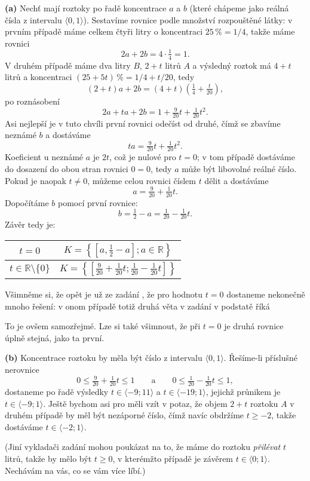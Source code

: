 \documentclass[12pt,a4paper]{article}
\newcommand{\R}{\mathbb{R}}
\theoremstyle{definition}
\newenvironment{res}{\proof}{\endproof}
\begin{document}
\begin{res}
\textbf{(a)}
Nechť mají roztoky po řadě koncentrace $a$ a $b$ (které chápeme jako reálná čísla z intervalu $\langle0, 1\rangle$). Sestavíme rovnice podle množství rozpouštěné látky: v prvním případě máme celkem čtyři litry o koncentraci $25\,\% = 1/4$, takže máme rovnici
\[ 2a + 2b = 4 \cdot \tfrac14 = 1. \]
V druhém případě máme dva litry $B$, $2+t$ litrů $A$ a výsledný roztok má $4 + t$ litrů a koncentraci $(25 + 5t)\,\% = 1/4 + t/20$, tedy
\[ (2+t)a + 2b = (4+t)\left(\tfrac14 + \tfrac{t}{20}\right), \]
po roznásobení
\[ 2a + ta + 2b = 1 + \tfrac{9}{20}t + \tfrac{1}{20}t^2. \]
Asi nejlepší je v tuto chvíli první rovnici odečíst od druhé, čímž se zbavíme neznámé $b$ a dostáváme
\[ ta = \tfrac{9}{20}t + \tfrac{1}{20}t^2. \]
Koeficient u neznámé $a$ je $2t$, což je nulové pro $t = 0$; v tom případě dostáváme do dosazení do obou stran rovnici $0 = 0$, tedy $a$ může být libovolné reálné číslo. Pokud je naopak $t \neq 0$, můžeme celou rovnici číslem $t$ dělit a dostáváme
\[ a = \tfrac{9}{20} + \tfrac{1}{20}t. \]
Dopočítáme $b$ pomocí první rovnice:
\[ b = \tfrac12 - a = \tfrac{1}{20} - \tfrac{1}{20}t. \]
Závěr  tedy je:

\begin{center}
\begin{tabular}{c|c}
$t = 0$ & $K = \left\{ \left[a, \tfrac12 - a\right]; a \in \R \right\}$ \\ \hline
$t \in \R \setminus \{0\}$ & $K = \left\{ \left[ \tfrac{9}{20} + \tfrac{1}{20}t; \tfrac{1}{20} - \tfrac{1}{20}t \right] \right\}$
\end{tabular}
\end{center}
Všimněme si, že opět je už ze zadání , že pro hodnotu $t = 0$ dostaneme nekonečně mnoho řešení: v onom případě totiž druhá věta v zadání v podstatě říká
\begin{center}
\end{center}
To je ovšem samozřejmé. Lze si také všimnout, že při $t = 0$ je druhá rovnice úplně stejná, jako ta první.

\medskip
\noindent\textbf{(b)}
Koncentrace roztoku by měla být číslo z intervalu $\langle0, 1\rangle$. Řešíme-li příslušné nerovnice
\[ 0 \leq \tfrac{9}{20} + \tfrac{1}{20}t \leq 1 \qquad \text{a} \qquad 0 \leq \tfrac{1}{20} - \tfrac{1}{20}t \leq 1, \]
dostaneme po řadě výsledky $t \in \langle-9; 11\rangle$ a $t \in \langle-19; 1\rangle$, jejichž průnikem je $t \in \langle -9; 1\rangle$. Ještě bychom asi pro  měli vzít v potaz, že objem $2 + t$ roztoku $A$ v druhém případě by měl být nezáporné číslo, čímž navíc obdržíme $t \geq -2$, takže dostáváme $t \in \langle -2; 1\rangle$.

(Jiní vykladači zadání mohou poukázat na to, že máme do roztoku \emph{přilévat} $t$ litrů, takže by mělo být $t \geq 0$, v kterémžto případě je závěrem $t \in \langle 0; 1\rangle$. Nechávám na vás, co se vám více líbí.)
\end{res}
\end{document}
